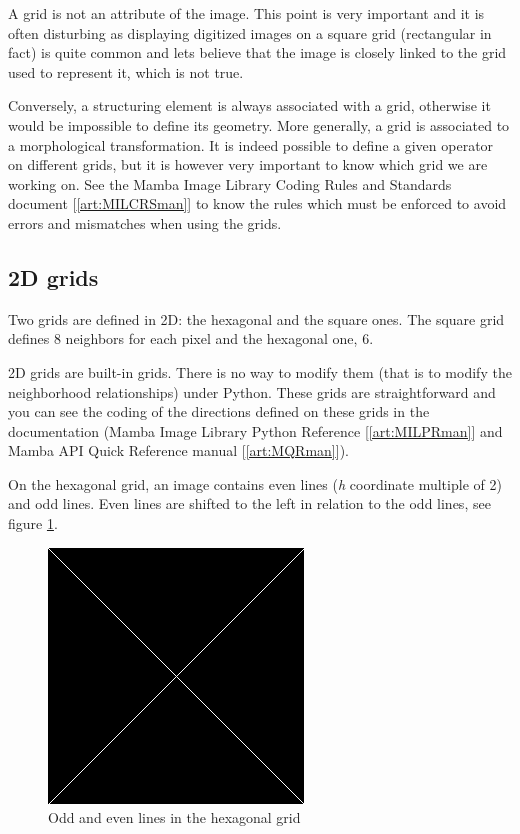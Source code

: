 \documentclass[a4paper,10pt,oneside]{article}
\begin{document}
A grid is not an attribute of the image. This point is very important and it is often disturbing as
displaying digitized images on a square grid (rectangular in fact) is quite common and lets believe that
the image is closely linked to the grid used to represent it, which is not true.

Conversely, a structuring element is always associated with a grid, otherwise it would be impossible
to define its geometry. More generally, a grid is associated to a morphological transformation. It is
indeed possible to define a given operator on different grids, but it is however very important to
know which grid we are working on. See the Mamba Image Library Coding Rules and Standards document [\ref{art:MILCRSman}] to
know the rules which must be enforced to avoid errors and mismatches when using the grids.

\subsection{2D grids}
\label{cha:2Dgrids}
Two grids are defined in 2D: the hexagonal and the square ones. 
The square grid defines 8 neighbors for each pixel and the hexagonal one, 6.

2D grids are built-in grids. There is no way to modify them (that is to modify the neighborhood
relationships) under Python. These grids are straightforward and you can see the coding of the directions
defined on these grids in the documentation (Mamba Image Library Python Reference [\ref{art:MILPRman}] and Mamba API
Quick Reference manual [\ref{art:MQRman}]).

On the hexagonal grid, an image contains even lines (\emph{h} coordinate multiple of 2) and odd lines. Even lines
are shifted to the left in relation to the odd lines, see figure \ref{fig:hex_grid}.
 
\begin{figure}
\centering
\includegraphics[scale=0.3]{figures/xxx.png}
\caption{Odd and even lines in the hexagonal grid}
\label{fig:hex_grid}
\end{figure}
\end{document}
